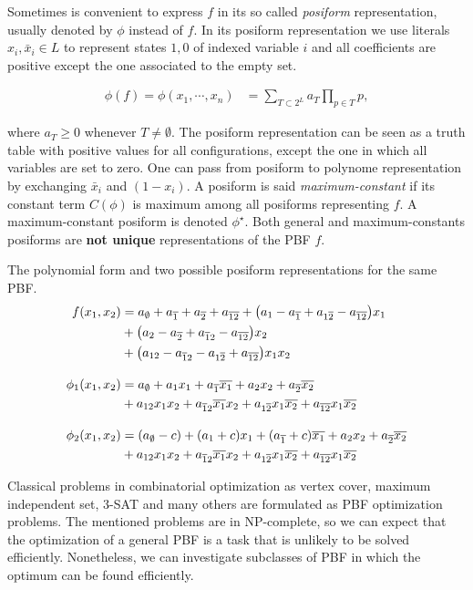 Sometimes is convenient to express $f$ in its so called \emph{posiform} representation, usually denoted by $\phi$ instead of $f$. In its posiform representation we use literals $x_i,\bar{x}_i \in L$  to represent states $1,0$ of indexed variable $i$ and all coefficients are positive except the one associated to the empty set.

\begin{align}
	\phi(f) = \phi(x_1,\cdots,x_n) &= \sum_{T \subset 2^{L}}a_T{\prod_{p \in T}{p}},
\end{align}

where $a_T \geq 0$ whenever $T\neq \emptyset$. The posiform representation can be seen as a truth table with positive values for all configurations, except the one in which all variables are set to zero. One can pass from posiform to polynome representation by exchanging $\bar{x}_i$ and $(1-x_i)$. A posiform is said \emph{maximum-constant}  if its constant term $C(\phi)$ is maximum among all posiforms representing $f$. A maximum-constant posiform is denoted $\phi^{\star}$. Both general and maximum-constants posiforms are \textbf{not unique} representations of the PBF $f$.

\begin{example}The polynomial form and two possible posiform representations for the same PBF.
\begin{align*}
	f(x_1,x_2) &= a_{\emptyset} + a_{\overline{1}} + a_{\overline{2}} + a_{\overline{12}} + \big(a_1 - a_{\overline{1}} + a_{1{\overline{2}}} - a_{\overline{12}}\big)x_1 \\
	&+ \big(a_{2} - a_{\overline{2}} + a_{{\overline{1}}2} - a_{{\overline{12}}}\big)x_2\\ 
	&+ \big(a_{12} - a_{{\overline{1}}2} - a_{1{\overline{2}}} + a_{{\overline{12}}}\big)x_1x_2 \\[1em]
	\phi_1(x_1,x_2) &= a_{\emptyset} + a_1x_1 + a_{\overline{1}}{\overline{x_1}} + a_2x_2 + a_{\overline{2}}{\overline{x_2}} \\ 
			&+ a_{12}x_1x_2 + a_{{\overline{1}}2}{\overline{x_1}}x_2 + a_{1{\overline{2}}}x_1{\overline{x_2}} + a_{{\overline{12}}}x_1{\overline{x_2}} \\[1em]			
	\phi_2(x_1,x_2) &= (a_{\emptyset}-c) + (a_1+c)x_1 + (a_{\overline{1}}+c){\overline{x_1}} + a_2x_2 + a_{\overline{2}}{\overline{x_2}} \\ 
			&+ a_{12}x_1x_2 + a_{{\overline{1}}2}{\overline{x_1}}x_2 + a_{1{\overline{2}}}x_1{\overline{x_2}} + a_{{\overline{12}}}x_1{\overline{x_2}} 	
\end{align*}
\end{example}

Classical problems in combinatorial optimization as vertex cover, maximum independent set, $3$-SAT and many others are formulated as PBF optimization problems. The mentioned problems are in NP-complete, so we can expect that the optimization of a general PBF is a task that is unlikely to be solved efficiently. Nonetheless, we can investigate subclasses of PBF in which the optimum can be found efficiently.

